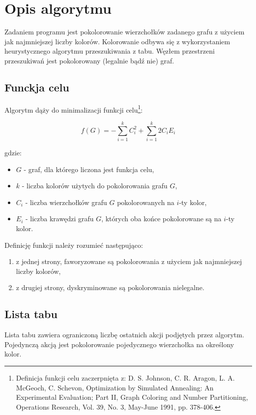 \section{Opis algorytmu}
Zadaniem programu jest pokolorowanie wierzchołków zadanego grafu z użyciem jak najmniejszej liczby kolorów.
Kolorowanie odbywa się z wykorzystaniem heurystycznego algorytmu przeszukiwania z tabu.
Węzłem przestrzeni przeszukiwań jest pokolorowany (legalnie bądź nie) graf.

\subsection{Funckja celu}
Algorytm dąży do minimalizacji funkcji celu\footnote{Definicja funkcji celu zaczerpnięta z: D. S. Johnson, C. R. Aragon, L. A. McGeoch, C. Schevon, Optimization by Simulated Annealing: An Experimental Evaluation; Part II, Graph Coloring and Number Partitioning, Operations Research, Vol. 39, No. 3, May-June 1991, pp. 378-406.}:

\begin{equation}
 f(G) = -\sum_{i=1}^{k} C_i^2 + \sum_{i=1}^{k} 2 C_i E_i
\end{equation}

gdzie:
\begin{itemize}
 \item $G$ - graf, dla którego liczona jest funkcja celu,
 \item $k$ - liczba kolorów użytych do pokolorowania grafu $G$,
 \item $C_i$ - liczba wierzchołków grafu $G$ pokolorowanych na $i$-ty kolor,
 \item $E_i$ - liczba krawędzi grafu $G$, których oba końce pokolorowane są na $i$-ty kolor.
\end{itemize}

Definicję funkcji należy rozumieć następująco:

\begin{enumerate}
 \item z jednej strony, faworyzowane są pokolorowania z użyciem jak najmniejszej liczby kolorów,
 \item z drugiej strony, dyskryminowane są pokolorowania nielegalne.
\end{enumerate}

\subsection{Lista tabu}
Lista tabu zawiera ograniczoną liczbę ostatnich akcji podjętych przez algorytm.
Pojedynczą akcją jest pokolorowanie pojedycznego wierzchołka na określony kolor.

